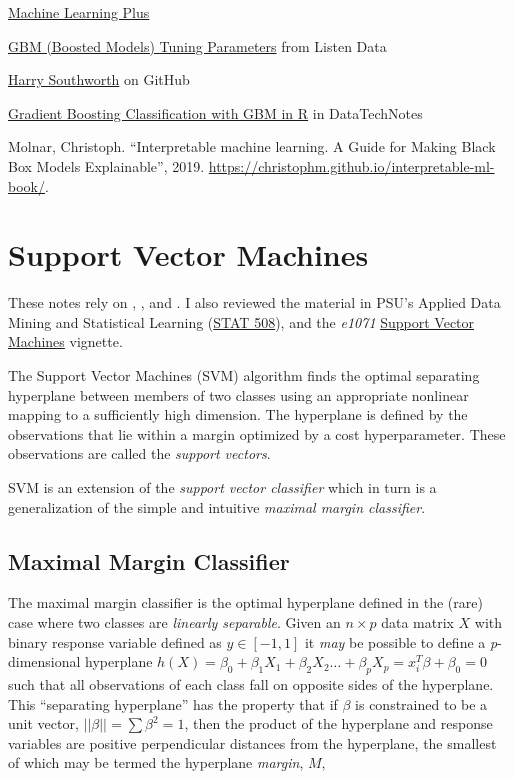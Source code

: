 \documentclass[]{book}
\begin{document}
\href{https://www.machinelearningplus.com/machine-learning/caret-package/}{Machine Learning Plus}

\href{https://www.listendata.com/2015/07/gbm-boosted-models-tuning-parameters.html}{GBM (Boosted Models) Tuning Parameters} from Listen Data

\href{https://github.com/harrysouthworth/gbm/blob/master/demo/bernoulli.R}{Harry Southworth} on GitHub

\href{https://www.datatechnotes.com/2018/03/classification-with-gradient-boosting.html}{Gradient Boosting Classification with GBM in R} in DataTechNotes

Molnar, Christoph. ``Interpretable machine learning. A Guide for Making Black Box Models Explainable'', 2019. \url{https://christophm.github.io/interpretable-ml-book/}.

\hypertarget{support-vector-machines}{%
\chapter{Support Vector Machines}\label{support-vector-machines}}

These notes rely on \citep{James2013}, \citep{Hastie2017}, and \citep{Kuhn2016}. I also reviewed the material in PSU's Applied Data Mining and Statistical Learning (\href{https://online.stat.psu.edu/stat508/}{STAT 508}), and the \emph{e1071} \href{https://cran.r-project.org/web/packages/e1071/vignettes/svmdoc.pdf}{Support Vector Machines} vignette.

The Support Vector Machines (SVM) algorithm finds the optimal separating hyperplane between members of two classes using an appropriate nonlinear mapping to a sufficiently high dimension. The hyperplane is defined by the observations that lie within a margin optimized by a cost hyperparameter. These observations are called the \emph{support vectors}.

SVM is an extension of the \emph{support vector classifier} which in turn is a generalization of the simple and intuitive \emph{maximal margin classifier}.

\hypertarget{maximal-margin-classifier}{%
\section{Maximal Margin Classifier}\label{maximal-margin-classifier}}

The maximal margin classifier is the optimal hyperplane defined in the (rare) case where two classes are \emph{linearly separable}. Given an \(n \times p\) data matrix \(X\) with binary response variable defined as \(y \in [-1, 1]\) it \emph{may} be possible to define a \emph{p}-dimensional hyperplane \(h(X) = \beta_0 + \beta_1X_1 + \beta_2X_2 \dots + \beta_pX_p = x_i^T \beta + \beta_0 = 0\) such that all observations of each class fall on opposite sides of the hyperplane. This ``separating hyperplane'' has the property that if \(\beta\) is constrained to be a unit vector, \(||\beta|| = \sum\beta^2 = 1\), then the product of the hyperplane and response variables are positive perpendicular distances from the hyperplane, the smallest of which may be termed the hyperplane \emph{margin}, \(M\),
\end{document}
